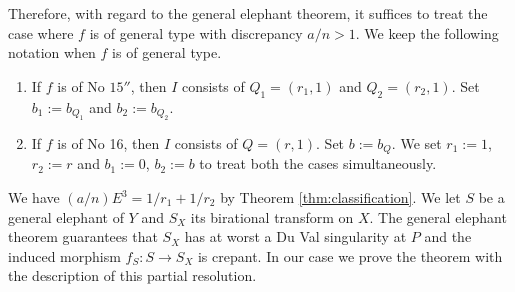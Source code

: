 \documentclass[a4paper,11pt]{amsart}
\theoremstyle{definition}
\theoremstyle{remark}
\numberwithin{equation}{section}
\begin{document}
Therefore, with regard to the general elephant theorem,
it suffices to treat the case where $f$ is of general type
with discrepancy $a/n>1$.
We keep the following notation when $f$ is of general type.
\begin{enumerate}
\item
If $f$ is of No $\textrm{15}''$,
then $I$ consists of $Q_1=(r_1,1)$ and $Q_2=(r_2,1)$.
Set $b_1:=b_{Q_1}$ and $b_2:=b_{Q_2}$.
\item
If $f$ is of No 16,
then $I$ consists of $Q=(r,1)$.
Set $b:=b_Q$.
We set $r_1:=1$, $r_2:=r$ and $b_1:=0$, $b_2:=b$
to treat both the cases simultaneously.
\end{enumerate}
We have $(a/n)E^3=1/r_1+1/r_2$ by Theorem \ref{thm:classification}.
We let $S$ be a general elephant of $Y$ and
$S_X$ its birational transform on $X$.
The general elephant theorem guarantees that
$S_X$ has at worst a Du Val singularity at $P$
and the induced morphism $f_S \colon S \to S_X$ is crepant.
In our case we prove the theorem with
the description of this partial resolution.
\end{document}
